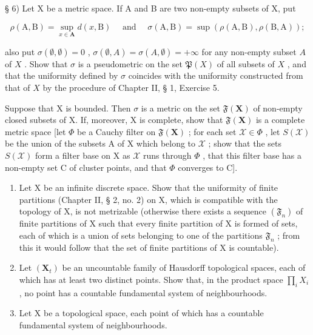 § 6) Let X be a metric space. If A and B are two non-empty subsets of X, put

\[
\rho (\mathrm{A}, \mathrm{B}) = \sup _ {x \in \mathbf {A}} d (x, \mathrm{B}) \quad \text { and } \quad \sigma (\mathrm{A}, \mathrm{B}) = \sup \left(\rho (\mathrm{A}, \mathrm{B}), \rho (\mathrm{B}, \mathrm{A})\right);
\]

also put \(\sigma(\emptyset, \emptyset) = 0\) , \(\sigma(\emptyset, A) = \sigma(A, \emptyset) = +\infty\) for any non-empty subset \(A\) of \(X\) . Show that \(\sigma\) is a pseudometric on the set \(\mathfrak{P}(X)\) of all subsets of \(X\) , and that the uniformity defined by \(\sigma\) coincides with the uniformity constructed from that of \(X\) by the procedure of Chapter II, § 1, Exercise 5.

Suppose that X is bounded. Then \(\sigma\) is a metric on the set \(\mathfrak{F}(\mathbf{X})\) of non-empty closed subsets of X. If, moreover, X is complete, show that \(\mathfrak{F}(\mathbf{X})\) is a complete metric space {[}let \(\Phi\) be a Cauchy filter on \(\mathfrak{F}(\mathbf{X})\) ; for each set \(\mathcal{X} \in \Phi\) , let \(S(\mathcal{X})\) be the union of the subsets A of X which belong to \(\mathcal{X}\) ; show that the sets \(S(\mathcal{X})\) form a filter base on X as \(\mathcal{X}\) runs through \(\Phi\) , that this filter base has a non-empty set C of cluster points, and that \(\Phi\) converges to C{]}.

\begin{enumerate}
\def\labelenumi{\arabic{enumi})}
\setcounter{enumi}{6}
\item
  Let X be an infinite discrete space. Show that the uniformity of finite partitions (Chapter II, § 2, no. 2) on X, which is compatible with the topology of X, is not metrizable (otherwise there exists a sequence \((\mathfrak{F}_n)\) of finite partitions of X such that every finite partition of X is formed of sets, each of which is a union of sets belonging to one of the partitions \(\mathfrak{F}_n\) ; from this it would follow that the set of finite partitions of X is countable).
\item
  Let \((\mathbf{X}_{t})\) be an uncountable family of Hausdorff topological spaces, each of which has at least two distinct points. Show that, in the product space \(\prod_{i} X_{i}\) , no point has a countable fundamental system of neighbourhoods.
\item
  Let X be a topological space, each point of which has a countable fundamental system of neighbourhoods.
\end{enumerate}

